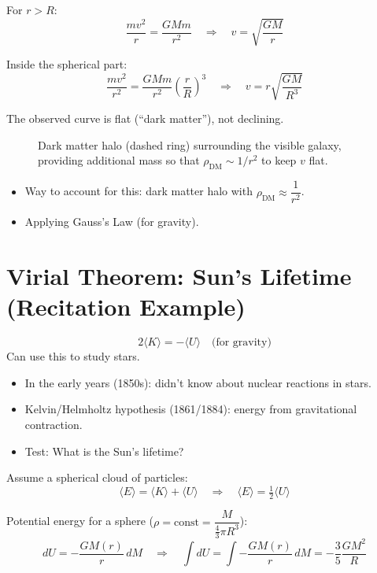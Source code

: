 For $r > R$:
\[
    \frac{mv^2}{r} = \frac{GMm}{r^2}
    \quad\Rightarrow\quad v = \sqrt{\frac{GM}{r}}
\]

Inside the spherical part:
\[
    \frac{mv^2}{r^2} = \frac{GMm}{r^2}\left(\frac{r}{R}\right)^3
    \quad\Rightarrow\quad v = r\sqrt{\frac{GM}{R^3}}
\]

The observed curve is flat (``dark matter''), not declining.

\begin{figure}[H]
\centering
\caption{Dark matter halo (dashed ring) surrounding the visible galaxy, providing additional mass so that $\rho_\text{DM} \sim 1/r^2$ to keep $v$ flat.}
\end{figure}

\begin{itemize}
    \item Way to account for this: dark matter halo with $\rho_\text{DM} \approx \dfrac{1}{r^2}$.
    \item Applying Gauss's Law (for gravity).
\end{itemize}


\section{Virial Theorem: Sun's Lifetime (Recitation Example)}

\[
    2\langle K\rangle = -\langle U\rangle \quad\text{(for gravity)}
\]
Can use this to study stars.

\begin{itemize}
    \item In the early years (1850s): didn't know about nuclear reactions in stars.
    \item Kelvin/Helmholtz hypothesis (1861/1884): energy from gravitational contraction.
    \item Test: What is the Sun's lifetime?
\end{itemize}

Assume a spherical cloud of particles:
\[
    \langle E\rangle = \langle K\rangle + \langle U\rangle
    \quad\Rightarrow\quad \langle E\rangle = \tfrac{1}{2}\langle U\rangle
\]

Potential energy for a sphere ($\rho = \text{const} = \dfrac{M}{\frac{4}{3}\pi R^3}$):
\[
    dU = -\frac{GM(r)}{r}\,dM
    \quad\Rightarrow\quad
    \int dU = \int -\frac{GM(r)}{r}\,dM = -\frac{3}{5}\frac{GM^2}{R}
\]

